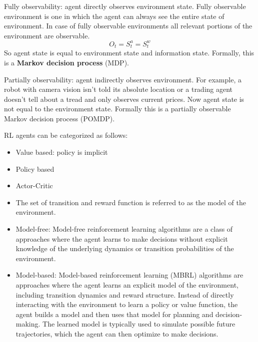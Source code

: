 Fully observability: agent directly observes environment state. Fully observable environment is one in which the agent can always see the entire state of environment. In case of fully observable environments all relevant portions of the environment are observable.
$$O_t=S_t^a=S_t^w$$
So agent state is equal to environment state and information state. Formally, this is a \textbf{Markov decision process} (MDP).

Partially observability: agent indirectly observes environment. For example, a robot with camera vision isn't told its absolute location or a trading agent doesn't tell about a tread and only observes current prices. Now agent state is not equal to the environment state. Formally this is a partially observable Markov decision process (POMDP). 

RL agents can be categorized as follows:
\begin{itemize}
	\item Value based: policy is implicit
	\item Policy based
	\item Actor-Critic
	\item The set of transition and reward function is referred to as the model of the environment.
	\item Model-free: Model-free reinforcement learning algorithms are a class of approaches where the agent learns to make decisions without explicit knowledge of the underlying dynamics or transition probabilities of the environment. 
	\item Model-based: Model-based reinforcement learning (MBRL) algorithms are approaches where the agent learns an explicit model of the environment, including transition dynamics and reward structure. Instead of directly interacting with the environment to learn a policy or value function, the agent builds a model and then uses that model for planning and decision-making. The learned model is typically used to simulate possible future trajectories, which the agent can then optimize to make decisions.
\end{itemize}

